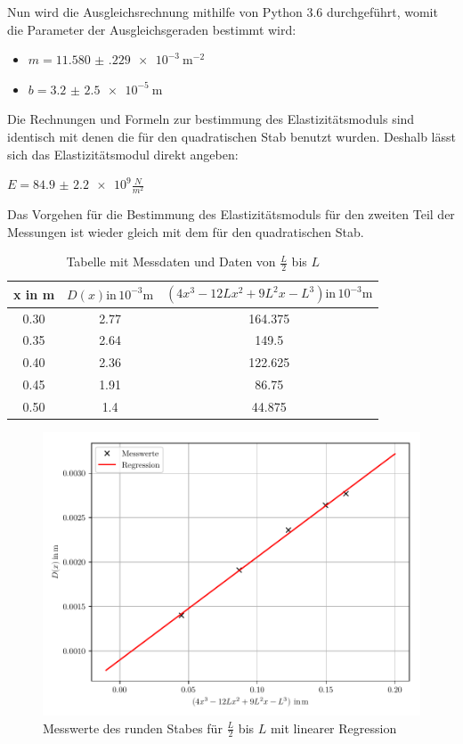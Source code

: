 Nun wird die Ausgleichsrechnung mithilfe von Python 3.6 durchgeführt, womit die Parameter
der Ausgleichsgeraden bestimmt wird:

\begin{itemize}
  \item $m = \SI{11.580(229)e-3}{\meter\tothe{-2}}$
  \item $b = \SI{3.2(25)e-5}{\meter}$
\end{itemize}

Die Rechnungen und Formeln zur bestimmung des Elastizitätsmoduls sind identisch mit
denen die für den quadratischen Stab benutzt wurden. Deshalb lässt sich das Elastizitätsmodul
direkt angeben:

\centerline{$E= \num{84.9(22)e9} \frac{N}{m^2}$}

Das Vorgehen für die Bestimmung des Elastizitätsmoduls für den zweiten Teil der
Messungen ist wieder gleich mit dem für den quadratischen Stab.

\begin{table}
  \centering
  \caption{Tabelle mit Messdaten und Daten von $\frac{L}{2}$ bis $L$}
  \begin{tabular}{c c c}
    \toprule
    x in \si{\meter} & $D(x) \text{in} \, 10^{-3} \si{\meter}$ &
    $ \left( 4x^3-12Lx^2+9L^2x-L^3 \right) \text{in} \, 10^{-3} \si{\meter}$\\
    \midrule
    0.30 & 2.77 &  164.375 \\
    0.35 & 2.64 &  149.5 \\
    0.40 & 2.36 &  122.625 \\
    0.45 & 1.91 &  86.75 \\
    0.50 & 1.4 & 44.875 \\
    \bottomrule
  \end{tabular}
\end{table}

\begin{figure}[H]
  \centering
  \includegraphics[width=\textwidth]{ausgleichsgerade4.1.pdf}
  \caption{Messwerte des runden Stabes für $\frac{L}{2}$ bis $L$ mit linearer Regression}
\end{figure}

